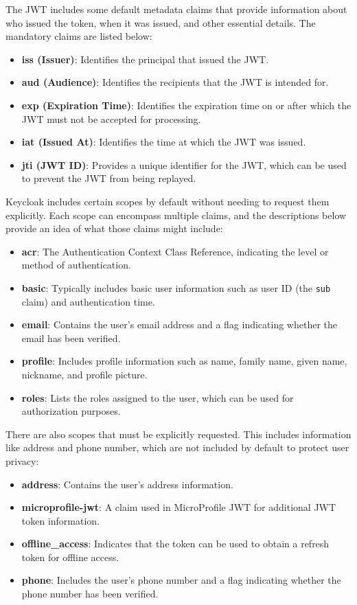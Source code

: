 The JWT includes some default metadata claims that provide information about who issued the token, when it was issued, and other essential details. The mandatory claims are listed below:

\begin{itemize} 
    \item \textbf{iss (Issuer)}: Identifies the principal that issued the JWT.
    \item \textbf{aud (Audience)}: Identifies the recipients that the JWT is intended for. 
    \item \textbf{exp (Expiration Time)}: Identifies the expiration time on or after which the JWT must not be accepted for processing. 
    \item \textbf{iat (Issued At)}: Identifies the time at which the JWT was issued. \item 
    \textbf{jti (JWT ID)}: Provides a unique identifier for the JWT, which can be used to prevent the JWT from being replayed. 
\end{itemize}

Keycloak includes certain scopes by default without needing to request them explicitly. Each scope can encompass multiple claims, and the descriptions below provide an idea of what those claims might include:

\begin{itemize} 
    \item \textbf{acr}: The Authentication Context Class Reference, indicating the level or method of authentication. 
    \item \textbf{basic}: Typically includes basic user information such as user ID (the \texttt{sub} claim) and authentication time. 
    \item \textbf{email}: Contains the user's email address and a flag indicating whether the email has been verified. 
    \item 
    \textbf{profile}: Includes profile information such as name, family name, given name, nickname, and profile picture. 
    \item \textbf{roles}: Lists the roles assigned to the user, which can be used for authorization purposes. 
\end{itemize}

There are also scopes that must be explicitly requested. This includes information like address and phone number, which are not included by default to protect user privacy:

\begin{itemize} 
    \item \textbf{address}: Contains the user's address information. 
    \item \textbf{microprofile-jwt}: A claim used in MicroProfile JWT for additional JWT token information. 
    \item \textbf{offline\_access}: Indicates that the token can be used to obtain a refresh token for offline access. 
    \item \textbf{phone}: Includes the user's phone number and a flag indicating whether the phone number has been verified. 
\end{itemize}

